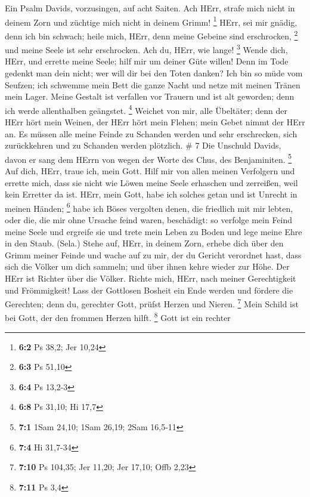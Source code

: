  Ein Psalm Davids, vorzusingen, auf acht Saiten.
 Ach HErr, strafe mich nicht in deinem Zorn und züchtige
mich nicht in deinem Grimm! \footnote{\textbf{6:2} Ps 38,2; Jer 10,24}
 HErr, sei mir gnädig, denn ich bin schwach; heile mich,
HErr, denn meine Gebeine sind erschrocken, \footnote{\textbf{6:3} Ps
  51,10}  und meine Seele ist sehr erschrocken. Ach du,
HErr, wie lange! \footnote{\textbf{6:4} Ps 13,2-3}  Wende
dich, HErr, und errette meine Seele; hilf mir um deiner Güte willen!
 Denn im Tode gedenkt man dein nicht; wer will dir bei den
Toten danken?  Ich bin so müde vom Seufzen; ich schwemme
mein Bett die ganze Nacht und netze mit meinen Tränen mein Lager.
 Meine Gestalt ist verfallen vor Trauern und ist alt
geworden; denn ich werde allenthalben geängstet. \footnote{\textbf{6:8}
  Ps 31,10; Hi 17,7}  Weichet von mir, alle Übeltäter; denn
der HErr hört mein Weinen,  der HErr hört mein Flehen; mein
Gebet nimmt der HErr an.  Es müssen alle meine Feinde zu
Schanden werden und sehr erschrecken, sich zurückkehren und zu Schanden
werden plötzlich. \# 7  Die Unschuld Davids, davon er sang
dem HErrn von wegen der Worte des Chus, des Benjaminiten. \footnote{\textbf{7:1}
  1Sam 24,10; 1Sam 26,19; 2Sam 16,5-11}  Auf dich, HErr,
traue ich, mein Gott. Hilf mir von allen meinen Verfolgern und errette
mich,  dass sie nicht wie Löwen meine Seele erhaschen und
zerreißen, weil kein Erretter da ist.  HErr, mein Gott, habe
ich solches getan und ist Unrecht in meinen Händen; \footnote{\textbf{7:4}
  Hi 31,7-34}  habe ich Böses vergolten denen, die friedlich
mit mir lebten, oder die, die mir ohne Ursache feind waren, beschädigt:
 so verfolge mein Feind meine Seele und ergreife sie und
trete mein Leben zu Boden und lege meine Ehre in den Staub. (Sela.)
 Stehe auf, HErr, in deinem Zorn, erhebe dich über den Grimm
meiner Feinde und wache auf zu mir, der du Gericht verordnet hast,
 dass sich die Völker um dich sammeln; und über ihnen kehre
wieder zur Höhe.  Der HErr ist Richter über die Völker.
Richte mich, HErr, nach meiner Gerechtigkeit und Frömmigkeit!
 Lass der Gottlosen Bosheit ein Ende werden und fördere die
Gerechten; denn du, gerechter Gott, prüfst Herzen und Nieren.
\footnote{\textbf{7:10} Ps 104,35; Jer 11,20; Jer 17,10; Offb 2,23}
 Mein Schild ist bei Gott, der den frommen Herzen hilft.
\footnote{\textbf{7:11} Ps 3,4}  Gott ist ein rechter

